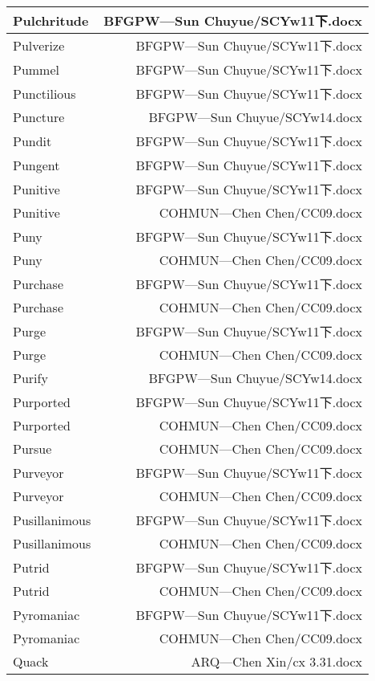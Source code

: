 \documentclass{article}
\begin{document}
\begin{center}
\begin{longtable}{|l|r|}
\hline
Pulchritude  &  BFGPW---Sun Chuyue/SCYw11下.docx\\  
\hline
Pulverize  &  BFGPW---Sun Chuyue/SCYw11下.docx\\  
\hline
Pummel  &  BFGPW---Sun Chuyue/SCYw11下.docx\\  
\hline
Punctilious  &  BFGPW---Sun Chuyue/SCYw11下.docx\\  
\hline
Puncture  &  BFGPW---Sun Chuyue/SCYw14.docx\\  
\hline
Pundit  &  BFGPW---Sun Chuyue/SCYw11下.docx\\  
\hline
Pungent  &  BFGPW---Sun Chuyue/SCYw11下.docx\\  
\hline
Punitive  &  BFGPW---Sun Chuyue/SCYw11下.docx\\  
\hline
Punitive  &  COHMUN---Chen Chen/CC09.docx\\  
\hline
Puny  &  BFGPW---Sun Chuyue/SCYw11下.docx\\  
\hline
Puny  &  COHMUN---Chen Chen/CC09.docx\\  
\hline
Purchase  &  BFGPW---Sun Chuyue/SCYw11下.docx\\  
\hline
Purchase  &  COHMUN---Chen Chen/CC09.docx\\  
\hline
Purge  &  BFGPW---Sun Chuyue/SCYw11下.docx\\  
\hline
Purge  &  COHMUN---Chen Chen/CC09.docx\\  
\hline
Purify  &  BFGPW---Sun Chuyue/SCYw14.docx\\  
\hline
Purported  &  BFGPW---Sun Chuyue/SCYw11下.docx\\  
\hline
Purported  &  COHMUN---Chen Chen/CC09.docx\\  
\hline
Pursue  &  COHMUN---Chen Chen/CC09.docx\\  
\hline
Purveyor  &  BFGPW---Sun Chuyue/SCYw11下.docx\\  
\hline
Purveyor  &  COHMUN---Chen Chen/CC09.docx\\  
\hline
Pusillanimous  &  BFGPW---Sun Chuyue/SCYw11下.docx\\  
\hline
Pusillanimous  &  COHMUN---Chen Chen/CC09.docx\\  
\hline
Putrid  &  BFGPW---Sun Chuyue/SCYw11下.docx\\  
\hline
Putrid  &  COHMUN---Chen Chen/CC09.docx\\  
\hline
Pyromaniac  &  BFGPW---Sun Chuyue/SCYw11下.docx\\  
\hline
Pyromaniac  &  COHMUN---Chen Chen/CC09.docx\\  
\hline
Quack  &  ARQ---Chen Xin/cx 3.31.docx\\  

\end{longtable}
\end{center}
\end{document}
